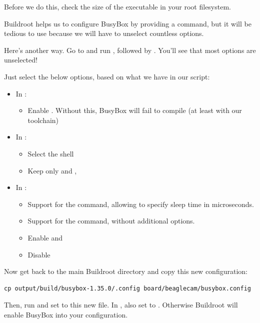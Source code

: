 Before we do this, check the size of the  executable in
your root filesystem.

Buildroot helps us to configure BusyBox by providing a  command, but it will be tedious to use because we
will have to unselect countless options.

Here's another way. Go to  and run
, followed by . You'll see
that most options are unselected!

Just select the below options, based on what we have in our
 script:
\begin{itemize}
  \item In :
  \begin{itemize}
     \item Enable . Without this, BusyBox
           will fail to compile (at least with our toolchain)
  \end{itemize}
  \item In :
  \begin{itemize}
     \item Select the  shell
     \item Keep only  and
           ,
  \end{itemize}
  \item In :
  \begin{itemize}
     \item Support for the  command, allowing to specify
           sleep time in microseconds.
     \item Support for the  command, without additional options.
     \item Enable  and \code{test as [}
     \item Disable 
  \end{itemize}
\end{itemize}

Now get back to the main Buildroot directory and copy this new
configuration:

\begin{verbatim}
cp output/build/busybox-1.35.0/.config board/beaglecam/busybox.config
\end{verbatim}

Then, run  and set
 to this new file. In , also set  to . Otherwise
Buildroot will enable BusyBox  into your configuration.

